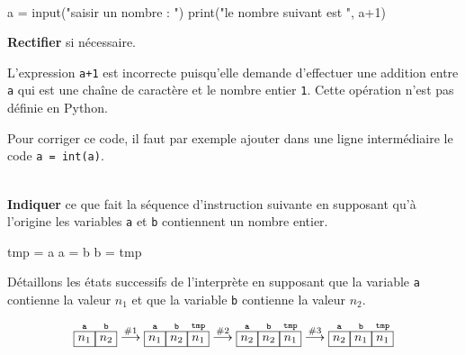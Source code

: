 \documentclass[a4paper,17pt]{extarticle}
\newenvironment{eleve}%
{\begin{activite}\color{noiramu}\\[-0.5cm]}
{\end{activite}}
\newenvironment{Shaded}{}{}
\newcommand{\DecValTok}[1]{\textcolor[rgb]{0.25,0.63,0.44}{{#1}}}
\newcommand{\StringTok}[1]{\textcolor[rgb]{0.25,0.44,0.63}{{#1}}}
\newcommand{\NormalTok}[1]{{#1}}
\newcommand{\OperatorTok}[1]{\textcolor[rgb]{0.40,0.40,0.40}{{#1}}}
\newcommand{\BuiltInTok}[1]{{#1}}
\begin{document}
\begin{eleve}
\begin{Shaded}
\begin{Highlighting}[]
\NormalTok{a }\OperatorTok{=} \BuiltInTok{input}\NormalTok{(}\StringTok{"saisir un nombre : "}\NormalTok{)}
\BuiltInTok{print}\NormalTok{(}\StringTok{"le nombre suivant est "}\NormalTok{, a}\OperatorTok{+}\DecValTok{1}\NormalTok{)}
\end{Highlighting}
\end{Shaded}

\textbf{Rectifier} si nécessaire.
        
        \end{eleve}\begin{reponse}
    L'expression \texttt{a+1} est incorrecte puisqu'elle demande d'effectuer
une addition entre \texttt{a} qui est une chaîne de caractère et le
nombre entier \texttt{1}. Cette opération n'est pas définie en Python.

Pour corriger ce code, il faut par exemple ajouter dans une ligne
intermédiaire le code \texttt{a\ =\ int(a)}.

        \end{reponse}\begin{eleve}
    \textbf{Indiquer} ce que fait la séquence d'instruction suivante en
supposant qu'à l'origine les variables \texttt{a} et \texttt{b}
contiennent un nombre entier.

\begin{Shaded}
\begin{Highlighting}[]
\NormalTok{tmp }\OperatorTok{=}\NormalTok{ a}
\NormalTok{a }\OperatorTok{=}\NormalTok{ b}
\NormalTok{b }\OperatorTok{=}\NormalTok{ tmp}
\end{Highlighting}
\end{Shaded}
        
        \end{eleve}\begin{reponse}
    Détaillons les états successifs de l'interprète en supposant que la
variable \texttt{a} contienne la valeur \(n_1\) et que la variable
\texttt{b} contienne la valeur \(n_2\).

\[
\overset{\texttt{a}}{\fbox{$n_1$}}
\overset{\texttt{b}}{\fbox{$n_2$}}
\overset{\text{\#1}}\longrightarrow
\overset{\texttt{a}}{\fbox{$n_1$}}
\overset{\texttt{b}}{\fbox{$n_2$}}
\overset{\texttt{tmp}}{\fbox{$n_1$}}
\overset{\text{\#2}}\longrightarrow
\overset{\texttt{a}}{\fbox{$n_2$}}
\overset{\texttt{b}}{\fbox{$n_2$}}
\overset{\texttt{tmp}}{\fbox{$n_1$}}
\overset{\text{\#3}}\longrightarrow
\overset{\texttt{a}}{\fbox{$n_2$}}
\overset{\texttt{b}}{\fbox{$n_1$}}
\overset{\texttt{tmp}}{\fbox{$n_1$}}
\]


\end{reponse}
\end{document}
